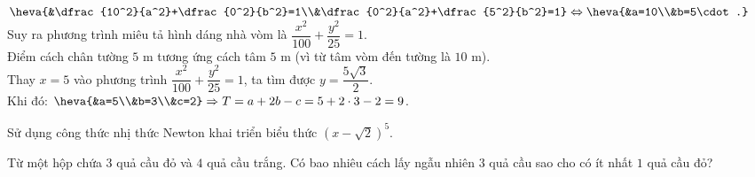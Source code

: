 \begin{ex}
{$\heva{&\dfrac{10^2}{a^2}+\dfrac{0^2}{b^2}=1\\&\dfrac{0^2}{a^2}+\dfrac{5^2}{b^2}=1}\Leftrightarrow\heva{&a=10\\&b=5\cdot.}$ \\
Suy ra phương trình miêu tả hình dáng nhà vòm là $\dfrac{x^2}{100}+\dfrac{y^2}{25}=1$.\\
Điểm cách chân tường $5$ m tương ứng cách tâm $5$ m (vì từ tâm vòm đến tường là $10$ m).\\
Thay $x=5$ vào phương trình $\dfrac{x^2}{100}+\dfrac{y^2}{25}=1$, ta tìm được $y=\dfrac{5\sqrt{3}}{2}$.\\
Khi đó: $\heva{&a=5\\&b=3\\&c=2}\Rightarrow T=a+2b-c=5+2\cdot 3-2=9$.}
\end{ex}

\TL


\begin{ex}%
Sử dụng công thức nhị thức Newton khai triển biểu thức $\left(x-\sqrt{2}\right)^5$.
\end{ex}
\begin{ex}%
Từ một hộp chứa $3$ quả cầu đỏ và $4$ quả cầu trắng. Có bao nhiêu cách lấy ngẫu nhiên $3$ quả cầu sao cho có ít nhất $1$ quả cầu đỏ?
\end{ex}

